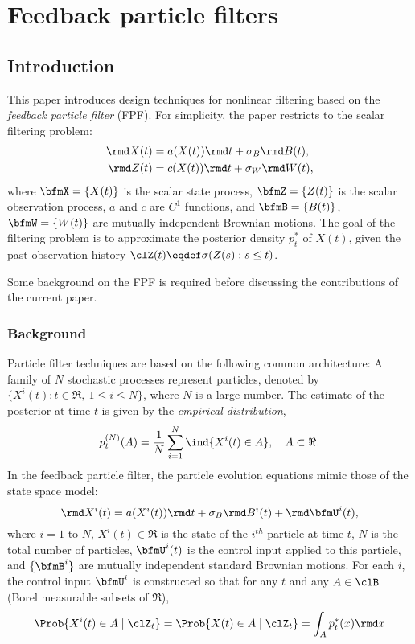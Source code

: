 \chapter{Feedback particle filters} 
\label{chap3_filtering}

\section{Introduction}
\label{s:intro}


This paper introduces design techniques for nonlinear filtering based on the  \textit{feedback particle filter} (FPF).   For simplicity, the paper restricts to the scalar filtering problem:
\begin{equation*}
\begin{aligned}
\rmd X(t)&=a(X(t)) \rmd t +\sigma_{B}\rmd B(t),\\
\rmd Z(t)&=c(X(t)) \rmd t + \sigma_{W}\rmd W(t),
\end{aligned}
\end{equation*}
where $\bfmX=\{X(t)\}$ is the scalar state process, $\bfmZ=\{Z(t)\}$ is the scalar observation process, $a$ and $c$ are $C^{1}$ functions, and  $\bfmB= \{B(t)\}$,  $\bfmW = \{W(t)\}$ are mutually independent Brownian motions.   The goal of the filtering problem is to approximate the posterior density 
$p^*_t$  of $X(t)$,
given the past observation history $\clZ(t)\eqdef\sigma(Z(s):s\leq t)$.

Some background on the FPF is required before discussing the contributions of the current paper.

\subsection{Background}

Particle filter techniques are based on the following common architecture:  A family of $N$ stochastic processes represent particles, denoted by $ \{X^i(t) : t\in\Re,\ 1\le i\le N  \}$, where $N$ is a large number.   The estimate of the posterior at time $t$ is given by the
\textit{empirical distribution},
\begin{equation}
p^{(N)}_t(A)=\dfrac{1}{N}\sum_{i=1}^{N} \ind  \{X^i(t)\in A \},\quad A\subset \Re.
\label{e:emp}
\end{equation}
In the feedback particle filter,  the particle evolution equations mimic those of the state space model:
\begin{equation}
\rmd X^i(t)=a(X^i(t)) \rmd t+\sigma_{B}\rmd B^i(t)+\rmd \bfmU^i(t),
\label{eq_controlled_sys}
\end{equation}
where $i=1$ to $N$, $X^i(t) \in \Re$ is the state of the $i^{th}$ particle at time $t$, $N$ is the total number of particles, $\bfmU^i(t)$ is the control input applied to this particle, and $\{\bfmB^i\}$ are mutually independent standard Brownian motions. For each $i$, the control input $\bfmU^i$ is constructed so that for any $t$ and any $A\in\clB $  (Borel measurable subsets of $\Re$),
\[
\Prob\{ X^i(t) \in A \mid \clZ_t\} 
=
\Prob\{ X(t) \in A \mid \clZ_t\}
=
\int_A p^*_t(x) \rmd x
\]

